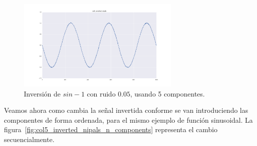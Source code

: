 \documentclass[11pt,spanish,listoffigures,listoftables]{tfgetsinf}
\begin{document}
    \begin{figure}[H]
        \centering
        \includegraphics[width=0.7\textwidth]{col5_inverted_nipals.png}
        \caption{Inversión de \(sin - 1\) con ruido \(0.05\), usando 5 componentes.}
        \label{fig:col5_inverted_nipals}
    \end{figure}
    
    Veamos ahora como cambia la señal invertida conforme se van introduciendo las componentes de forma ordenada, para el mismo ejemplo de función sinusoidal. La figura~\ref{fig:col5_inverted_nipals_n_components} representa el cambio secuencialmente. 
    
\end{document}
